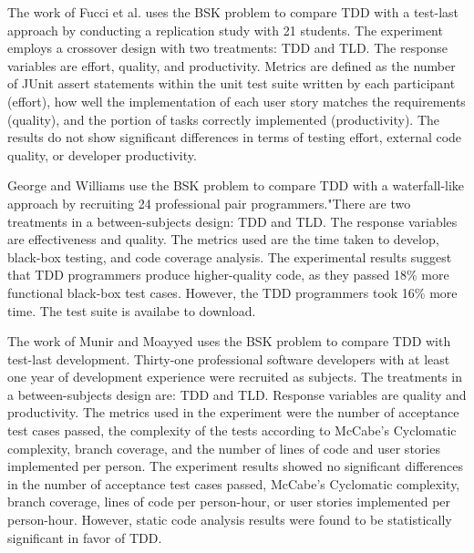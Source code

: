 The work of Fucci et al. \cite{Fucci2016} uses the BSK problem to compare TDD with a test-last approach by conducting a replication study with 21 students. The experiment employs a crossover design with two treatments: TDD and TLD. The response variables are effort, quality, and productivity. Metrics are defined as the number of JUnit assert statements within the unit test suite written by each participant (effort), how well the implementation of each user story matches the requirements (quality), and the portion of tasks correctly implemented (productivity). The results do not show significant differences in terms of testing effort, external code quality, or developer productivity. %

George and Williams \cite{George2004} use the BSK problem to compare TDD with a waterfall-like approach by recruiting 24 professional pair programmers."There are two treatments in a between-subjects design: TDD and TLD. The response variables are effectiveness and quality. The metrics used are the time taken to develop, black-box testing, and code coverage analysis. The experimental results suggest that TDD programmers produce higher-quality code, as they passed 18\% more functional black-box test cases. However, the TDD programmers took 16\% more time. The test suite is availabe to download.  %

The work of Munir and Moayyed \cite{Munir2014} uses the BSK problem to compare TDD with test-last development. Thirty-one professional software developers with at least one year of development experience were recruited as subjects. The treatments in a between-subjects design are: TDD and TLD. Response variables are quality and productivity. The metrics used in the experiment were the number of acceptance test cases passed, the complexity of the tests according to McCabe's Cyclomatic complexity, branch coverage, and the number of lines of code and user stories implemented per person. The experiment results showed no significant differences in the number of acceptance test cases passed, McCabe’s Cyclomatic complexity, branch coverage, lines of code per person-hour, or user stories implemented per person-hour. However, static code analysis results were found to be statistically significant in favor of TDD. %

